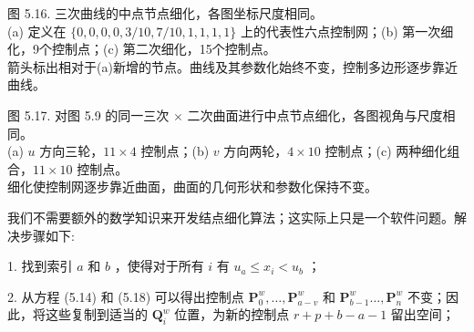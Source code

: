 \documentclass[../main.tex]{subfiles}
\begin{document}
\begin{center}
\begin{minipage}{34.2cm}
\vspace*{.6\baselineskip}
\centering
\begin{minipage}[b]{22.6cm}
\centering
{}
\end{minipage}\hfill
\begin{minipage}[b]{10.6cm}
\centering
{}
\end{minipage}
\par\smallskip
图 5.16. 三次曲线的中点节点细化，各图坐标尺度相同。\\ (a) 定义在 \(\{0,0,0,0,3/10,7/10,1,1,1,1\}\) 上的代表性六点控制网；(b) 第一次细化，9个控制点；(c) 第二次细化，15个控制点。\\ 箭头标出相对于(a)新增的节点。曲线及其参数化始终不变，控制多边形逐步靠近曲线。
\end{minipage}
\end{center}

\begin{center}
\begin{minipage}{35.6cm}
\vspace*{.6\baselineskip}
\centering
\begin{minipage}[b]{23.3cm}
\centering
{}
\end{minipage}\hfill
\begin{minipage}[b]{11.3cm}
\centering
{}
\end{minipage}
\par\smallskip
图 5.17. 对图 5.9 的同一三次 \(\times\) 二次曲面进行中点节点细化，各图视角与尺度相同。\\ (a) \(u\) 方向三轮，\(11\times4\) 控制点；(b) \(v\) 方向两轮，\(4\times10\) 控制点；(c) 两种细化组合，\(11\times10\) 控制点。\\ 细化使控制网逐步靠近曲面，曲面的几何形状和参数化保持不变。
\end{minipage}
\end{center}

我们不需要额外的数学知识来开发结点细化算法；这实际上只是一个软件问题。解决步骤如下:

1. 找到索引 \(a\) 和 \(b\) ，使得对于所有 \(i\) 有 \({u}_{a} \leq  {x}_{i} < {u}_{b}\) ；

2. 从方程 (5.14) 和 (5.18) 可以得出控制点 \({\mathbf{P}}_{0}^{w},\ldots ,{\mathbf{P}}_{a - v}^{w}\) 和 \({\mathbf{P}}_{b - 1}^{w}\ldots ,{\mathbf{P}}_{n}^{w}\) 不变；因此，将这些复制到适当的 \({\mathbf{Q}}_{i}^{w}\) 位置，为新的控制点 \(r + p + b - a - 1\) 留出空间；
\end{document}
